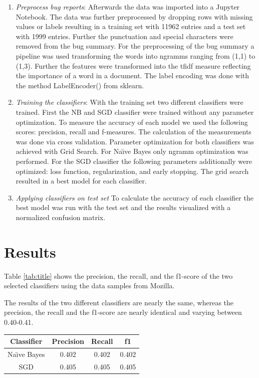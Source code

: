 \documentclass[sigconf,screen]{acmart}
\begin{document}
\begin{enumerate}
	\item \textit{Preprocess bug reports}: Afterwards the data was imported into a Jupyter Notebook. The data was further preprocessed by dropping rows with missing values or labels resulting in a training set with 11962 entries and a test set with 1999 entries. Further the punctuation and special characters were removed from the bug summary. For the preprocessing of the bug summary a pipeline was used transforming the words into ngramms ranging from (1,1) to (1,3). Further the features were transformed into the tfidf measure reflecting the importance of a word in a document. The label encoding was done with the method LabelEncoder() from sklearn.
	\item \textit{Training the classifiers}: With the training set two different classifiers were trained. First the NB and SGD classifier were trained without any parameter optimization. To measure the accuracy of each model we used the following scores: precision, recall and f-measures. The calculation of the measurements was done via cross validation. Parameter optimization for both classifiers was achieved with Grid Search. For Na{\"\i}ve Bayes only ngramm optimization was performed. For the SGD classifier the following parameters additionally were optimized: loss function, regularization, and early stopping. The grid search resulted in a best model for each classifier.
	\item \textit{Applying classifiers on test set} To calculate the accuracy of each classifier the best model was run with the test set and the results visualized with a normalized confusion matrix. 
	
\end{enumerate}

\section{Results}
Table \ref{tab:title} shows the precision, the recall, and the f1-score of the two selected classifiers using the data samples from Mozilla.

The results of the two different classifiers are nearly the same, whereas the precision, the recall and the f1-score are nearly identical and varying between 0.40-0.41.

\begin{center}
	\centering
	\label{tab:title} 
	\begin{tabular}{ |c|c|c|c| } 
		\hline
		\textbf{Classifier} & \textbf{Precision} & \textbf{Recall} & \textbf{f1} \\
		\hline
		Na{\"\i}ve Bayes & 0.402 & 0.402 & 0.402 \\
		\hline
		SGD & 0.405 & 0.405 & 0.405 \\
		\hline
	\end{tabular}
\end{center}
\end{document}
